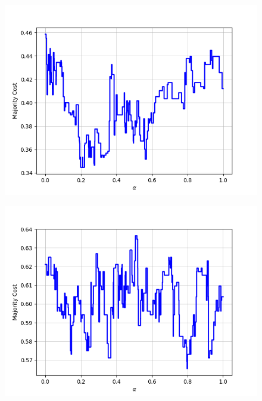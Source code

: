 \begin{figure}[H]
\centering
\begin{minipage}{.24\textwidth}
  \centering
  {\includegraphics[width=\linewidth]{plots/omniglot-intra-ac-cnn/Alphabet_of_the_Magi}}
\end{minipage}
\begin{minipage}{.24\textwidth}
  \centering
  {\includegraphics[width=\linewidth]{plots/omniglot-intra-ac-cnn/Anglo-Saxon_Futhorc}}
\end{minipage}
\begin{minipage}{.24\textwidth}
  \centering

\end{minipage}
\end{figure}
